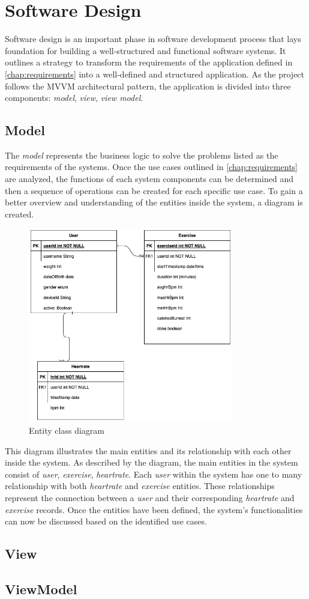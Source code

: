 \section{Software Design}
Software design is an important phase in software development process that lays foundation for building a well-structured and functional software systems. 
It outlines a strategy to transform the requirements of the application defined in \autoref{chap:requirements} into a well-defined and structured application.
As the project follows the MVVM architectural pattern, the application is divided into three components: \emph{model}, \emph{view}, \emph{view model}. 

\subsection{Model}
The \emph{model} represents the business logic to solve the problems listed as the requirements of the systems. Once the use cases outlined in \autoref{chap:requirements} are analyzed, the functions of each system components can be determined and then a sequence of operations can be created for each specific use case.
To gain a better overview and understanding of the entities inside the system, a diagram is created.
\begin{figure}[H]
    \centering
    \includegraphics[width=0.8\textwidth]{diagrams/ham-entity.drawio.png}
    \caption{Entity class diagram}
    \label{fig:entity_diagram}
\end{figure}
This diagram illustrates the main entities and its relationship with each other inside the system. As described by the diagram, the main entities in the system consist of \emph{user}, \emph{exercise}, \emph{heartrate}. 
Each \emph{user} within the system has one to many relationship with both \emph{heartrate} and \emph{exercise} entities. These relationships represent the connection between a \emph{user} and their corresponding \emph{heartrate} and \emph{exercise} records. 
Once the entities have been defined, the system's functionalities can now be discussed based on the identified use cases.

\subsection{View}
\subsection{ViewModel}